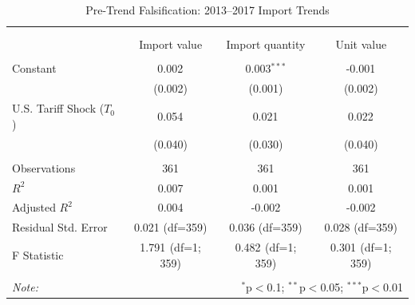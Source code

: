 \begin{table}[!htbp] \centering
  \caption{Pre-Trend Falsification: 2013--2017 Import Trends}
  \label{tab:trade_pretrends}
\begin{tabular}{@{\extracolsep{5pt}}lccc}
\\[-1.8ex]\hline
\hline \\[-1.8ex]
\\[-1.8ex] & \multicolumn{1}{c}{Import value} & \multicolumn{1}{c}{Import quantity} & \multicolumn{1}{c}{Unit value}  \\
\hline \\[-1.8ex]
 Constant & 0.002$^{}$ & 0.003$^{***}$ & -0.001$^{}$ \\
& (0.002) & (0.001) & (0.002) \\
 U.S. Tariff Shock ($T_0$) & 0.054$^{}$ & 0.021$^{}$ & 0.022$^{}$ \\
& (0.040) & (0.030) & (0.040) \\
\hline \\[-1.8ex]
 Observations & 361 & 361 & 361 \\
 $R^2$ & 0.007 & 0.001 & 0.001 \\
 Adjusted $R^2$ & 0.004 & -0.002 & -0.002 \\
 Residual Std. Error & 0.021 (df=359) & 0.036 (df=359) & 0.028 (df=359) \\
 F Statistic & 1.791$^{}$ (df=1; 359) & 0.482$^{}$ (df=1; 359) & 0.301$^{}$ (df=1; 359) \\
\hline
\hline \\[-1.8ex]
\textit{Note:} & \multicolumn{3}{r}{$^{*}$p$<$0.1; $^{**}$p$<$0.05; $^{***}$p$<$0.01} \\
\end{tabular}
\end{table}